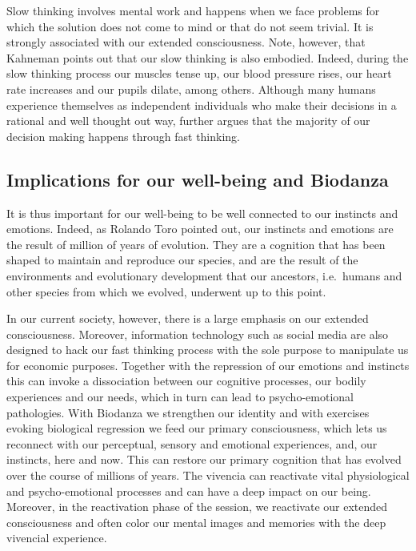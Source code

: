 \documentclass[
  11pt,
]{book}
\begin{document}
Slow thinking involves mental work and happens when we face problems for which the solution does not come to mind or that do not seem trivial. It is strongly associated with our extended consciousness. Note, however, that Kahneman points out that our slow thinking is also embodied. Indeed, during the slow thinking process our muscles tense up, our blood pressure rises, our heart rate increases and our pupils dilate, among others. Although many humans experience themselves as independent individuals who make their decisions in a rational and well thought out way, \citet{Kahneman2012} further argues that the majority of our decision making happens through fast thinking.

\hypertarget{implications-for-our-well-being-and-biodanza}{%
\subsection{Implications for our well-being and Biodanza}\label{implications-for-our-well-being-and-biodanza}}

It is thus important for our well-being to be well connected to our instincts and emotions. Indeed, as Rolando Toro pointed out, our instincts and emotions are the result of million of years of evolution. They are a cognition that has been shaped to maintain and reproduce our species, and are the result of the environments and evolutionary development that our ancestors, i.e.~humans and other species from which we evolved, underwent up to this point.

In our current society, however, there is a large emphasis on our extended consciousness. Moreover, information technology such as social media are also designed to hack our fast thinking process with the sole purpose to manipulate us for economic purposes. Together with the repression of our emotions and instincts this can invoke a dissociation between our cognitive processes, our bodily experiences and our needs, which in turn can lead to psycho-emotional pathologies. With Biodanza we strengthen our identity and with exercises evoking biological regression we feed our primary consciousness, which lets us reconnect with our perceptual, sensory and emotional experiences, and, our instincts, here and now. This can restore our primary cognition that has evolved over the course of millions of years. The vivencia can reactivate vital physiological and psycho-emotional processes and can have a deep impact on our being. Moreover, in the reactivation phase of the session, we reactivate our extended consciousness and often color our mental images and memories with the deep vivencial experience.
\end{document}
